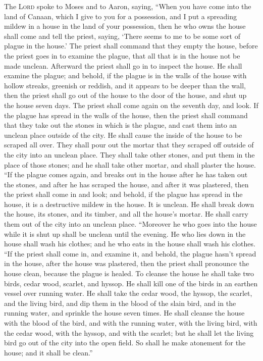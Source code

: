  The \textsc{Lord} spoke to Moses and to Aaron, saying,
 ``When you have come into the land of Canaan, which I
give to you for a possession, and I put a spreading mildew in a house in
the land of your possession,  then he who owns the house
shall come and tell the priest, saying, `There seems to me to be some
sort of plague in the house.'  The priest shall command
that they empty the house, before the priest goes in to examine the
plague, that all that is in the house not be made unclean. Afterward the
priest shall go in to inspect the house.  He shall
examine the plague; and behold, if the plague is in the walls of the
house with hollow streaks, greenish or reddish, and it appears to be
deeper than the wall,  then the priest shall go out of
the house to the door of the house, and shut up the house seven days.
 The priest shall come again on the seventh day, and
look. If the plague has spread in the walls of the house,
 then the priest shall command that they take out the
stones in which is the plague, and cast them into an unclean place
outside of the city.  He shall cause the inside of the
house to be scraped all over. They shall pour out the mortar that they
scraped off outside of the city into an unclean place. 
They shall take other stones, and put them in the place of those stones;
and he shall take other mortar, and shall plaster the house.
 ``If the plague comes again, and breaks out in the house
after he has taken out the stones, and after he has scraped the house,
and after it was plastered,  then the priest shall come
in and look; and behold, if the plague has spread in the house, it is a
destructive mildew in the house. It is unclean.  He shall
break down the house, its stones, and its timber, and all the house's
mortar. He shall carry them out of the city into an unclean place.
 ``Moreover he who goes into the house while it is shut
up shall be unclean until the evening.  He who lies down
in the house shall wash his clothes; and he who eats in the house shall
wash his clothes.  ``If the priest shall come in, and
examine it, and behold, the plague hasn't spread in the house, after the
house was plastered, then the priest shall pronounce the house clean,
because the plague is healed.  To cleanse the house he
shall take two birds, cedar wood, scarlet, and hyssop. 
He shall kill one of the birds in an earthen vessel over running water.
 He shall take the cedar wood, the hyssop, the scarlet,
and the living bird, and dip them in the blood of the slain bird, and in
the running water, and sprinkle the house seven times. 
He shall cleanse the house with the blood of the bird, and with the
running water, with the living bird, with the cedar wood, with the
hyssop, and with the scarlet;  but he shall let the
living bird go out of the city into the open field. So shall he make
atonement for the house; and it shall be clean.''

